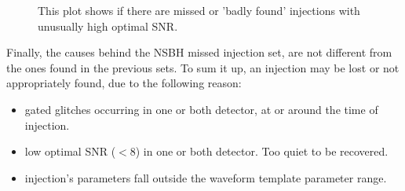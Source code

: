 \documentclass[binding=0.6cm, LaM]{sapthesis}
\begin{document}
                \begin{figure}[h]
                        \noindent
                        \label{missed_inj}
                        \centering
                        \caption{ This plot shows if there are missed or 'badly found' injections with unusually high optimal SNR. }
			 \label{fig:missed_inj}
                \end{figure}
	Finally, the causes behind the NSBH missed injection set, 
	are not different from the ones found in the previous sets.
	To sum it up, an injection may  be lost or not appropriately found,
	due to the following reason:
	\begin{itemize}
		\item gated glitches occurring in one or both detector, at or around the time of injection.
		\item low optimal SNR ($<$8) in one or both detector. Too quiet to be recovered.
		\item injection’s parameters fall outside the waveform template parameter range.
	\end{itemize}

\end{document}
